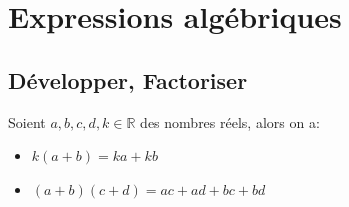 \documentclass[french]{book}
\begin{document}

\newpage
\section{Expressions algébriques}

\subsection{Développer, Factoriser}
\begin{prop}
Soient $a,b,c,d,k \in \mathbb{R}$ des nombres réels, alors on a: 
\begin{itemize}
\item[$\bullet$] $k(a+b)=ka+kb$
\item[$\bullet$] $(a+b)(c+d)=ac+ad+bc+bd$
\end{itemize}
\end{prop}
\end{document}
